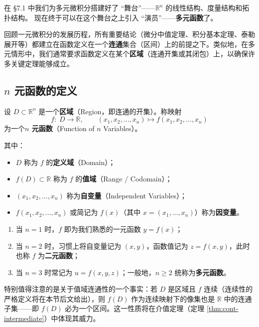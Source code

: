 \documentclass[lang=cn,11pt]{elegantbook}
\begin{document}
在 §7.1 中我们为多元微积分搭建好了 ``舞台''——$\mathbb{R}^n$ 的线性结构、度量结构和拓扑结构。
现在终于可以在这个舞台之上引入 ``演员''——\textbf{多元函数}了。

回顾一元微积分的发展历程，所有重要结论（微分中值定理、积分基本定理、泰勒展开等）都建立在函数定义在一个\textbf{连通}集合（区间）上的前提之下。类似地，在多元情形中，我们通常要求函数定义在某个\textbf{区域}（连通开集或其闭包）上，以确保许多关键定理能够成立。


\subsection{$n$ 元函数的定义}

\begin{definition} \label{def:multivar-func}
设 $D\subset\mathbb{R}^n$ 是一个\textbf{区域}（Region，即连通的开集）。称映射
\[
f:\;D\longrightarrow\mathbb{R},\qquad (x_1,x_2,\dots,x_n)\longmapsto f(x_1,x_2,\dots,x_n)
\]
为一个\textbf{$n$ 元函数}（Function of $n$ Variables）。

其中：
\begin{itemize}
  \item $D$ 称为 $f$ 的\textbf{定义域}（Domain）；
  \item $f(D)\subset\mathbb{R}$ 称为 $f$ 的\textbf{值域}（Range / Codomain）；
  \item $(x_1,x_2,\dots,x_n)$ 称为\textbf{自变量}（Independent Variables）；
  \item $f(x_1,x_2,\dots,x_n)$ 或简记为 $f(x)$（其中 $x=(x_1,\dots,x_n)$）称为\textbf{因变量}。
\end{itemize}
\end{definition}

\begin{note}[记号惯例]
\begin{enumerate}
  \item[(1)] 当 $n=1$ 时，$f$ 即为我们熟悉的一元函数 $y=f(x)$；
  \item[(2)] 当 $n=2$ 时，习惯上将自变量记为 $(x,y)$，函数值记为 $z=f(x,y)$，此时也称 $f$ 为\textbf{二元函数}；
  \item[(3)] 当 $n=3$ 时常记为 $u=f(x,y,z)$；一般地，$n\geq 2$ 统称为\textbf{多元函数}。
\end{enumerate}
特别值得注意的是关于值域连通性的一个事实：若 $D$ 是区域且 $f$ 连续（连续性的严格定义将在本节后文给出），则 $f(D)$ 作为连续映射下的像集也是 $\mathbb{R}$ 中的连通子集——即 $f(D)$ 必为一个区间。这一性质将在介值定理（定理 \ref{thm:cont-intermediate}）中体现其威力。
\end{note}
\end{document}
